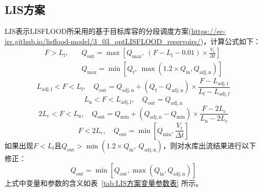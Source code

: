 \subsection{LIS方案}
LIS表示LISFLOOD所采用的基于目标库容的分段调度方案(\url{https://ec-jrc.github.io/lisflood-model/3\_03\_optLISFLOOD\_reservoirs/})，计算公式如下：
\begin{equation}
\begin{aligned}
    F > L_{\mathrm{f}}, \quad &Q_{\mathrm{out}}=\max\left[Q_{\mathrm{max}},\ (F-L_{\mathrm{f}}-0.01) \times \frac{V_{\mathrm {t}} }{\Delta t}\right] \\
    \quad &Q_{\mathrm{max}} = \min\left[Q_{\mathrm{f}},\ {\max(1.2 \times Q_{\mathrm{in}},Q_{\mathrm{adj,n}})}\right]
\end{aligned}
\end{equation}
\begin{equation}
    L_{\mathrm{adj,f}} < F < L_{\mathrm{f}}, \quad Q_{\mathrm{out}}=Q_{\mathrm{adj,n}}+\left(Q_{\mathrm{f}}-Q_{\mathrm{adj,n}}\right) \times \frac{F-L_{\mathrm{adj,f}}}{L_{\mathrm{f}}-L_{\mathrm{adj,f}}}
\end{equation}
\begin{equation}
    L_{\mathrm{n}} < F < L_{\mathrm{adj,f}}, \quad Q_{\mathrm{out}}=Q_{\mathrm{adj,n}}
\end{equation}
\begin{equation}
    2L_{\mathrm{c}} < F < L_{\mathrm{n}}, \quad Q_{\mathrm{out}}=Q_{\mathrm{min}}+\left(Q_{\mathrm{adj,n}}-Q_{\mathrm{min}}\right) \times \frac{F-2L_{\mathrm{c}}}{L_{\mathrm{n}}-2L_{\mathrm{c}}}
\end{equation}
\begin{equation}
    F < 2L_{\mathrm{c}}, \quad Q_{\mathrm{out}}=\min\left[Q_{\mathrm{min}}, \frac{V_{\mathrm {t}} }{\Delta t}\right]
\end{equation}
如果出现$F<L_{\mathrm{f}}$且$Q_{\mathrm{out}}>\min(1.2 \times Q_{\mathrm{in}},\ Q_{\mathrm{adj,n}})$，则对水库出流结果进行以下修正：
\begin{equation}
    Q_{\mathrm{out}} = \min\left[Q_{\mathrm{out}}, \max(Q_{\mathrm{in}}, Q_{\mathrm{adj,n}})\right]
\end{equation}
上式中变量和参数的含义如表~\ref{tab:LIS方案变量参数表} 所示。

